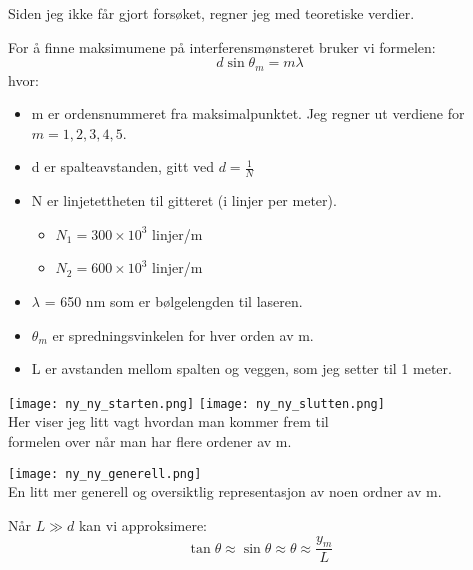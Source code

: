 \documentclass{article}
\begin{document}
Siden jeg ikke får gjort forsøket, regner jeg med teoretiske verdier. 

\vspace{0.2in}

For å finne maksimumene på interferensmønsteret bruker vi formelen:
\begin{equation} 
    d \sin{\theta_m} = m \lambda \end{equation} \label{eq:32}
hvor:
\vspace{0.1in}
\begin{itemize}
    \item m er ordensnummeret fra maksimalpunktet. Jeg regner ut verdiene for $m = 1,2,3,4,5$. 
    \item d er spalteavstanden, gitt ved $d = \frac{1}{N}$
    \item N er linjetettheten til gitteret (i linjer per meter).
    \begin{itemize}
        \item $N_1 = 300 \times 10^3$ linjer/m
        \item $N_2 = 600 \times 10^3$ linjer/m
    \end{itemize}
    \item $\lambda $ = 650 nm som er bølgelengden til laseren.
    \item $\theta_m$ er spredningsvinkelen for hver orden av m.
    \item L er avstanden mellom spalten og veggen, som jeg setter til 1 meter. 
\end{itemize}


\begin{center} 
\texttt{[image: ny\_ny\_starten.png]}
\texttt{[image: ny\_ny\_slutten.png]}\\
\caption{\label{fig:starten på noe} Her viser jeg litt vagt hvordan man kommer frem til\\ formelen over når man har flere ordener av m.}
\end{center}



\begin{center}
\texttt{[image: ny\_ny\_generell.png]}\\
\caption{\label{fig:Generell} En litt mer generell og oversiktlig representasjon av noen ordner av m.}
\end{center}

\vspace{0.2in}

Når $L \gg d$ kan vi approksimere:
\begin{equation*}
    \tan{\theta} \approx \sin{\theta} \approx \theta \approx \frac{y_m}{L}
\end{equation*}
\end{document}
